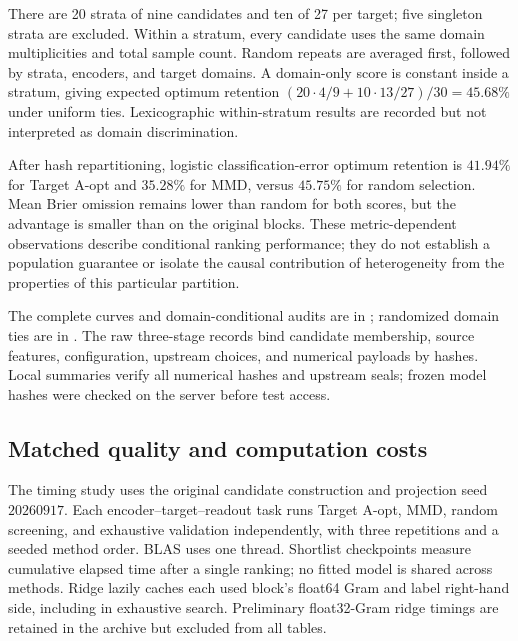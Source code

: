 \begin{table}[ht]
\centering
\caption{The construction challenge uses logistic Brier. Final loss is validation-selected at $s=50$. The last columns measure retention of one empirical optimum when half of each non-singleton domain-composition stratum is kept, not final selection accuracy. Means average strata and encoders within targets, then six targets. Domain matching uses 20 randomized tie orders for final loss; its within-stratum entry is the exact uniform-tie expectation.}
\label{app:construction-table}

\end{table}

There are 20 strata of nine candidates and ten of 27 per target; five singleton strata are excluded. Within a stratum, every candidate uses the same domain multiplicities and total sample count. Random repeats are averaged first, followed by strata, encoders, and target domains. A domain-only score is constant inside a stratum, giving expected optimum retention $(20\cdot4/9+10\cdot13/27)/30=45.68\%$ under uniform ties. Lexicographic within-stratum results are recorded but not interpreted as domain discrimination.

After hash repartitioning, logistic classification-error optimum retention is $41.94\%$ for Target A-opt and $35.28\%$ for MMD, versus $45.75\%$ for random selection. Mean Brier omission remains lower than random for both scores, but the advantage is smaller than on the original blocks. These metric-dependent observations describe conditional ranking performance; they do not establish a population guarantee or isolate the causal contribution of heterogeneity from the properties of this particular partition.

The complete curves and domain-conditional audits are in ; randomized domain ties are in . The raw three-stage records bind candidate membership, source features, configuration, upstream choices, and numerical payloads by hashes. Local summaries verify all numerical hashes and upstream seals; frozen model hashes were checked on the server before test access.


\subsection{Matched quality and computation costs}
\label{app:cost}
The timing study uses the original candidate construction and projection seed $20260917$. Each encoder--target--readout task runs Target A-opt, MMD, random screening, and exhaustive validation independently, with three repetitions and a seeded method order. BLAS uses one thread. Shortlist checkpoints measure cumulative elapsed time after a single ranking; no fitted model is shared across methods. Ridge lazily caches each used block's float64 Gram and label right-hand side, including in exhaustive search. Preliminary float32-Gram ridge timings are retained in the archive but excluded from all tables.

